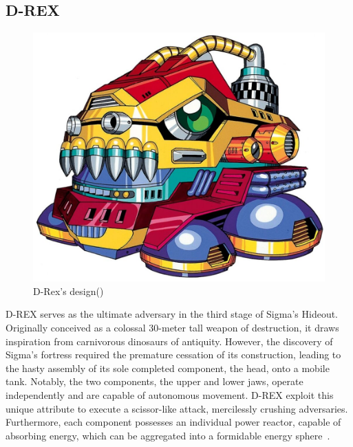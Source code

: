 \subsection{D-REX}
\begin{figure}[htp]
	\centering
	\includegraphics[height=\portraitsize]{figures/X1/Sigma_stages/Drex.jpg}
	\caption{D-Rex's design(\cite{book:MMX_Complete_art})}
\end{figure}
D-REX serves as the ultimate adversary in the third stage of Sigma's Hideout. Originally conceived as a colossal 30-meter tall weapon of destruction, it draws inspiration from carnivorous dinosaurs of antiquity. However, the discovery of Sigma's fortress required the premature cessation of its construction, leading to the hasty assembly of its sole completed component, the head, onto a mobile tank. Notably, the two components, the upper and lower jaws, operate independently and are capable of autonomous movement. D-REX exploit this unique attribute to execute a scissor-like attack, mercilessly crushing adversaries. Furthermore, each component possesses an individual power reactor, capable of absorbing energy, which can be aggregated into a formidable energy sphere~\cite{wayback:X_resources}.

